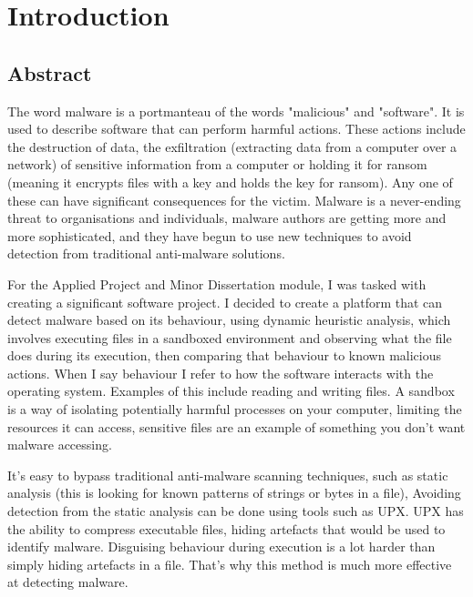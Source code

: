 \chapter{Introduction}

\section{Abstract}
The word malware is a portmanteau of the words "malicious" and "software".
It is used to describe software that can perform harmful actions.
These actions include the destruction of data,
the exfiltration (extracting data from a computer over a network)
of sensitive information from a computer or
holding it for ransom (meaning it encrypts files with a key and holds the key for ransom).
Any one of these can have significant consequences for the victim.
Malware is a never-ending threat to organisations and individuals,
malware authors are getting more and more sophisticated,
and they have begun to use new techniques to avoid detection
from traditional anti-malware solutions.

For the Applied Project and Minor Dissertation module,
I was tasked with creating a significant software project.
I decided to create a platform that can detect malware based on its behaviour,
using dynamic heuristic analysis, which involves executing files
in a sandboxed environment and observing what the file does during its execution,
then comparing that behaviour to known malicious actions.
When I say behaviour I refer to how the
software interacts with the operating system.
Examples of this include reading and writing files.
A sandbox is a way of isolating potentially harmful processes on your computer,
limiting the resources it can access,
sensitive files are an example of something you don't want malware accessing.

It's easy to bypass traditional anti-malware scanning techniques,
such as static analysis (this is looking for known patterns of strings or bytes in a file),
Avoiding detection from the static analysis can be done using tools such as UPX.
UPX has the ability to compress executable files, \cite{upx}
hiding artefacts that would be used to identify malware.
Disguising behaviour during execution is a lot harder
than simply hiding artefacts in a file.
That's why this method is much more effective at detecting malware.

